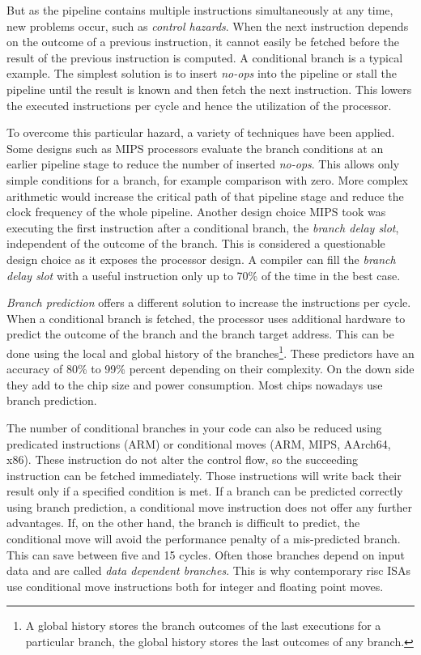 \documentclass[12pt,twoside,notitlepage]{report}
\begin{document}
But as the pipeline contains multiple instructions simultaneously at any time, new problems occur, such as \textit{control hazards}. When the next instruction depends on the outcome of a previous instruction, it cannot easily be fetched before the result of the previous instruction is computed. A conditional branch is a typical example. The simplest solution is to insert \textit{no-ops} into the pipeline or stall the pipeline until the result is known and then fetch the next instruction. This lowers the executed instructions per cycle and hence the utilization of the processor.

To overcome this particular hazard, a variety of techniques have been applied.
Some designs such as MIPS processors evaluate the branch conditions at an earlier pipeline stage to reduce the number of inserted \textit{no-ops}. This allows only simple conditions for a branch, for example comparison with zero. More complex arithmetic would increase the critical path of that pipeline stage and reduce the clock frequency of the whole pipeline. Another design choice MIPS took was executing the first instruction after a conditional branch, the \textit{branch delay slot}, independent of the outcome of the branch. This is considered a questionable design choice as it exposes the processor design. A compiler can fill the \textit{branch delay slot} with a useful instruction only up to 70\% of the time in the best case\cite{mcfarling1986reducing}. 

\textit{Branch prediction} offers a different solution to increase the instructions per cycle. When a conditional branch is fetched, the processor uses additional hardware to predict the outcome of the branch and the branch target address. This can be done using the local and global history of the branches\footnote{A global history stores the branch outcomes of the last executions for a particular branch, the global history stores the last outcomes of any branch.}. These predictors have an accuracy of 80\% to 99\% percent depending on their complexity\cite{chang1997improving}. On the down side they add to the chip size and power consumption. Most chips nowadays use branch prediction.

The number of conditional branches in your code can also be reduced using predicated instructions (ARM) or conditional moves (ARM, MIPS, AArch64, x86). These instruction do not alter the control flow, so the succeeding instruction can be fetched immediately. Those instructions will write back their result only if a specified condition is met. If a branch can be predicted correctly using branch prediction, a conditional move instruction does not offer any further advantages. If, on the other hand, the branch is difficult to predict, the conditional move will avoid the performance penalty of a mis-predicted branch. This can save between five and 15 cycles. Often those branches depend on input data and are called \textit{data dependent branches}. This is why contemporary \gls{risc} \gls{ISA}s use conditional move instructions both for integer and floating point moves.
\end{document}
